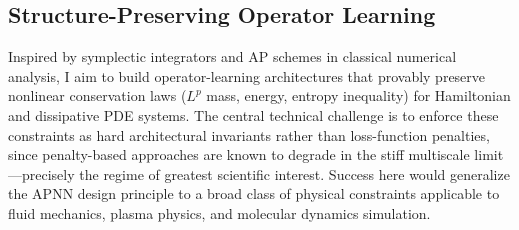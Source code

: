 \subsection{Structure-Preserving Operator Learning}

Inspired by symplectic integrators and AP schemes in classical numerical
analysis, I aim to build operator-learning architectures that provably
preserve nonlinear conservation laws ($L^p$ mass, energy, entropy inequality)
for Hamiltonian and dissipative PDE systems.  The central technical challenge
is to enforce these constraints as hard architectural invariants rather than
loss-function penalties, since penalty-based approaches are known to degrade
in the stiff multiscale limit---precisely the regime of greatest scientific
interest.  Success here would generalize the APNN design principle to a broad
class of physical constraints applicable to fluid mechanics, plasma physics,
and molecular dynamics simulation.
